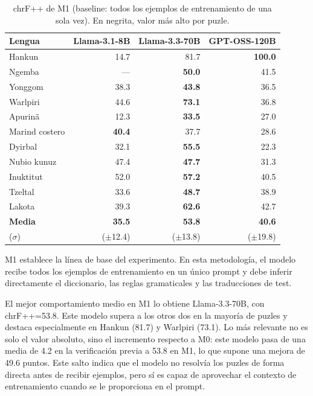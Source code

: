 \begin{table}[H]
	\centering
	\caption{chrF++ de M1 (baseline: todos los ejemplos de entrenamiento de una sola vez). En negrita, valor más alto por puzle.}
	\label{tab:resultados_m1}
	{\fontsize{10.5pt}{12pt}\selectfont
		\begin{tabular*}{0.95\textwidth}{@{\extracolsep{\fill}} lrrr}
			\toprule
			\textbf{Lengua} & \textbf{Llama-3.1-8B} & \textbf{Llama-3.3-70B} & \textbf{GPT-OSS-120B} \\
			\midrule
			Hankun          & 14.7              & 81.7              & \textbf{100.0} \\
			Ngemba          & {\color{gray}---} & \textbf{50.0}     & 41.5          \\
			Yonggom         & 38.3              & \textbf{43.8}     & 36.5          \\
			Warlpiri        & 44.6              & \textbf{73.1}     & 36.8          \\
			Apurinã         & 12.3              & \textbf{33.5}     & 27.0          \\
			Marind costero  & \textbf{40.4}     & 37.7              & 28.6          \\
			Dyirbal         & 32.1              & \textbf{55.5}     & 22.3          \\
			Nubio kunuz     & 47.4              & \textbf{47.7}     & 31.3          \\
			Inuktitut       & 52.0              & \textbf{57.2}     & 40.5          \\
			Tzeltal         & 33.6              & \textbf{48.7}     & 38.9          \\
			Lakota          & 39.3              & \textbf{62.6}     & 42.7          \\
			\midrule
			\textbf{Media}      & \textbf{35.5} & \textbf{53.8} & \textbf{40.6} \\
			($\sigma$) & ($\pm$12.4) & ($\pm$13.8) & ($\pm$19.8) \\
			\bottomrule
		\end{tabular*}
	}
\end{table}

M1 establece la línea de base del experimento. En esta metodología, el modelo recibe todos los ejemplos de entrenamiento en un único prompt y debe inferir directamente el diccionario, las reglas gramaticales y las traducciones de test.

El mejor comportamiento medio en M1 lo obtiene Llama-3.3-70B, con chrF++=53.8. Este modelo supera a los otros dos en la mayoría de puzles y destaca especialmente en Hankun (81.7) y Warlpiri (73.1). Lo más relevante no es solo el valor absoluto, sino el incremento respecto a M0: este modelo pasa de una media de 4.2 en la verificación previa a 53.8 en M1, lo que supone una mejora de 49.6 puntos. Este salto indica que el modelo no resolvía los puzles de forma directa antes de recibir ejemplos, pero sí es capaz de aprovechar el contexto de entrenamiento cuando se le proporciona en el prompt.

